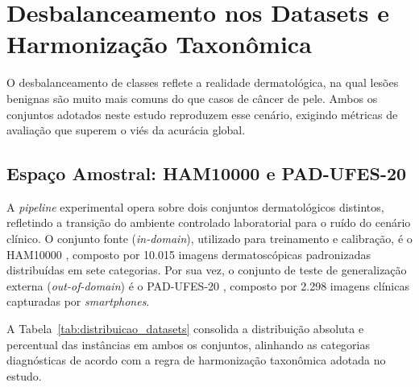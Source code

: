 \documentclass[oneside,english,brazilian]{UNISINOSmonografia}
\begin{document}
\section{Desbalanceamento nos Datasets e Harmonização Taxonômica}

O desbalanceamento de classes reflete a realidade dermatológica, na qual lesões benignas são muito mais comuns do que casos de câncer de pele. Ambos os conjuntos adotados neste estudo reproduzem esse cenário, exigindo métricas de avaliação que superem o viés da acurácia global.

\subsection{Espaço Amostral: HAM10000 e PAD-UFES-20}

A \textit{pipeline} experimental opera sobre dois conjuntos dermatológicos distintos, refletindo a transição do ambiente controlado laboratorial para o ruído do cenário clínico. O conjunto fonte (\textit{in-domain}), utilizado para treinamento e calibração, é o HAM10000 \cite{tschandl2018ham10000}, composto por 10.015 imagens dermatoscópicas padronizadas distribuídas em sete categorias. Por sua vez, o conjunto de teste de generalização externa (\textit{out-of-domain}) é o PAD-UFES-20 \cite{pacheco2020pad}, composto por 2.298 imagens clínicas capturadas por \textit{smartphones}. 

A Tabela~\ref{tab:distribuicao_datasets} consolida a distribuição absoluta e percentual das instâncias em ambos os conjuntos, alinhando as categorias diagnósticas de acordo com a regra de harmonização taxonômica adotada no estudo.
\end{document}
